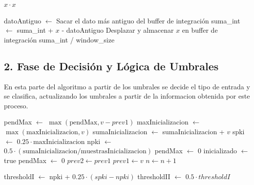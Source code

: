 \begin{algorithm}[H]
\caption{Cuadrado e Integración de Ventana}
\begin{algorithmic}[1]
    \State \Return $x \cdot x$
\EndFunction

    \State datoAntiguo $\leftarrow$ Sacar el dato más antiguo del buffer de integración
    \State suma\_int $\leftarrow$ suma\_int + $x$ - datoAntiguo
    \State Desplazar y almacenar $x$ en buffer de integración
    \State \Return suma\_int / window\_size
\EndFunction
\end{algorithmic}
\end{algorithm}

\subsection{2. Fase de Decisión y Lógica de Umbrales}
En esta parte del algoritmo a partir de los umbrales se decide el tipo de entrada y se clasifica, actualizando los umbrales a partir de la informacion obtenida por este proceso.
\begin{algorithm}[H]
\caption{Fase de Decisión}
\begin{algorithmic}[1]
    \State pendMax $\leftarrow$ $\max(\text{pendMax}, v - prev1)$
        \State maxInicializacion $\leftarrow$ $\max(\text{maxInicializacion}, v)$
        \State sumaInicializacion $\leftarrow$ sumaInicializacion + $v$
            \State spki $\leftarrow$ $0.25 \cdot \text{maxInicializacion}$
            \State npki $\leftarrow$ $0.5 \cdot (\text{sumaInicializacion} / \text{muestrasInicializacion})$
            \State {}
            \State pendMax $\leftarrow$ $0$
            \State inicializado $\leftarrow$ true
        \EndIf
    \Else
            \State {}
            \State pendMax $\leftarrow$ $0$
        \EndIf
        \State {}
    \EndIf
    \State $prev2 \leftarrow prev1$
    \State $prev1 \leftarrow v$
    \State $n \leftarrow n + 1$
\EndProcedure

    \State thresholdI $\leftarrow$ npki + $0.25 \cdot (spki - npki)$
    \State thresholdII $\leftarrow$ $0.5 \cdot thresholdI$
\EndProcedure
\end{algorithmic}
\end{algorithm}

